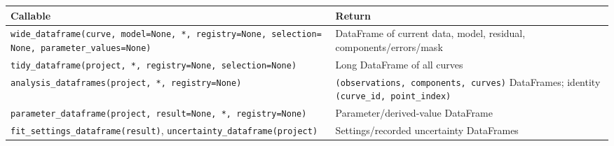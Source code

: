 \documentclass[
  10pt,
  a4paper,
  oneside]{scrreprt}
\begin{document}
\begin{longtable}[]{@{}ll@{}}
\toprule
\begin{minipage}[b]{0.47\columnwidth}\raggedright
Callable\strut
\end{minipage} & \begin{minipage}[b]{0.47\columnwidth}\raggedright
Return\strut
\end{minipage}\tabularnewline
\midrule
\endhead
\begin{minipage}[t]{0.47\columnwidth}\raggedright
\texttt{wide\_dataframe(curve,\ model=None,\ *,\ registry=None,\ selection=None,\ parameter\_values=None)}\strut
\end{minipage} & \begin{minipage}[t]{0.47\columnwidth}\raggedright
DataFrame of current data, model, residual, components/errors/mask\strut
\end{minipage}\tabularnewline
\begin{minipage}[t]{0.47\columnwidth}\raggedright
\texttt{tidy\_dataframe(project,\ *,\ registry=None,\ selection=None)}\strut
\end{minipage} & \begin{minipage}[t]{0.47\columnwidth}\raggedright
Long DataFrame of all curves\strut
\end{minipage}\tabularnewline
\begin{minipage}[t]{0.47\columnwidth}\raggedright
\texttt{analysis\_dataframes(project,\ *,\ registry=None)}\strut
\end{minipage} & \begin{minipage}[t]{0.47\columnwidth}\raggedright
\texttt{(observations,\ components,\ curves)} DataFrames; identity
\texttt{(curve\_id,\ point\_index)}\strut
\end{minipage}\tabularnewline
\begin{minipage}[t]{0.47\columnwidth}\raggedright
\texttt{parameter\_dataframe(project,\ result=None,\ *,\ registry=None)}\strut
\end{minipage} & \begin{minipage}[t]{0.47\columnwidth}\raggedright
Parameter/derived-value DataFrame\strut
\end{minipage}\tabularnewline
\begin{minipage}[t]{0.47\columnwidth}\raggedright
\texttt{fit\_settings\_dataframe(result)},
\texttt{uncertainty\_dataframe(project)}\strut
\end{minipage} & \begin{minipage}[t]{0.47\columnwidth}\raggedright
Settings/recorded uncertainty DataFrames\strut

\end{minipage}
\end{longtable}
\end{document}
